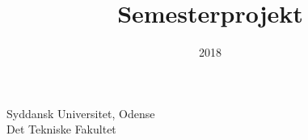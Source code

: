 \documentclass[../main.tex]{subfiles}
\title{Semesterprojekt}
\author{}
\date{2018}
\begin{document}
  \clearpage\maketitle
  \thispagestyle{empty}

  \noindent
  Syddansk Universitet, Odense\\
  Det Tekniske Fakultet\\
  \newpage
\end{document}
